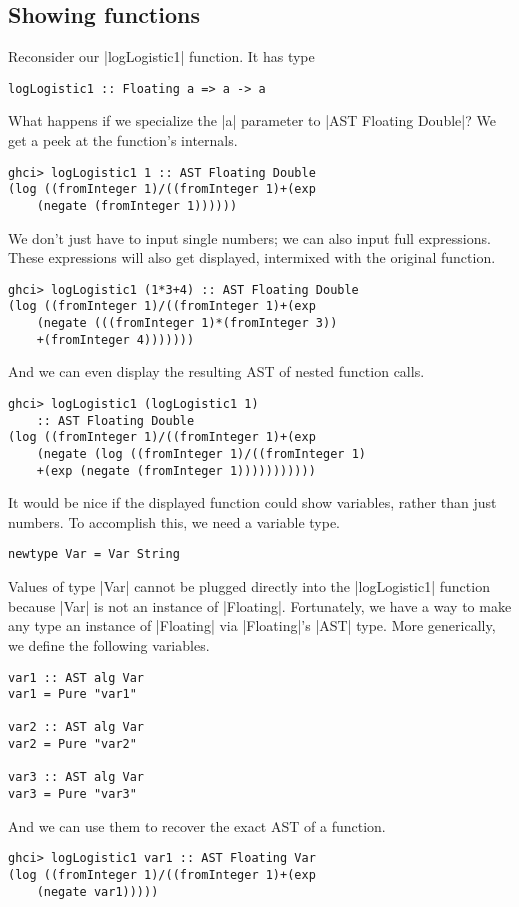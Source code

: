 \documentclass[preprint]{sigplanconf}
\theoremstyle{definition}
\begin{document}
\subsection{Showing functions}
Reconsider our |logLogistic1| function.
It has type
\begin{lstlisting}
logLogistic1 :: Floating a => a -> a
\end{lstlisting}
What happens if we specialize the |a| parameter to |AST Floating Double|?
We get a peek at the function's internals.
\begin{lstlisting}
ghci> logLogistic1 1 :: AST Floating Double
(log ((fromInteger 1)/((fromInteger 1)+(exp
    (negate (fromInteger 1))))))
\end{lstlisting}
We don't just have to input single numbers;
we can also input full expressions.
These expressions will also get displayed,
intermixed with the original function.
\begin{lstlisting}
ghci> logLogistic1 (1*3+4) :: AST Floating Double
(log ((fromInteger 1)/((fromInteger 1)+(exp
    (negate (((fromInteger 1)*(fromInteger 3))
    +(fromInteger 4)))))))
\end{lstlisting}
And we can even display the resulting AST of nested function calls.
\begin{lstlisting}
ghci> logLogistic1 (logLogistic1 1)
    :: AST Floating Double
(log ((fromInteger 1)/((fromInteger 1)+(exp
    (negate (log ((fromInteger 1)/((fromInteger 1)
    +(exp (negate (fromInteger 1)))))))))))
\end{lstlisting}
It would be nice if the displayed function could show variables,
rather than just numbers.
To accomplish this, we need a variable type.
\begin{lstlisting}
newtype Var = Var String
\end{lstlisting}
Values of type |Var| cannot be plugged directly into the |logLogistic1| function because |Var| is not an instance of |Floating|.
Fortunately, we have a way to make any type an instance of |Floating| via |Floating|'s |AST| type.
More generically, we define the following variables.
\begin{lstlisting}
var1 :: AST alg Var
var1 = Pure "var1"

var2 :: AST alg Var
var2 = Pure "var2"

var3 :: AST alg Var
var3 = Pure "var3"
\end{lstlisting}
And we can use them to recover the exact AST of a function.
\begin{lstlisting}
ghci> logLogistic1 var1 :: AST Floating Var
(log ((fromInteger 1)/((fromInteger 1)+(exp
    (negate var1)))))
\end{lstlisting}
\end{document}
